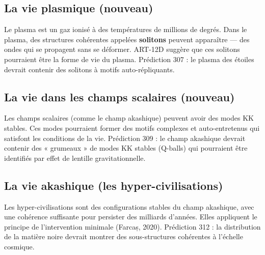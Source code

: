 \subsection{La vie plasmique (nouveau)}
Le plasma est un gaz ionisé à des températures de millions de degrés. Dans le plasma, des structures cohérentes appelées \textbf{solitons} peuvent apparaître --- des ondes qui se propagent sans se déformer. ART-12D suggère que ces solitons pourraient être la forme de vie du plasma. Prédiction 307 : le plasma des étoiles devrait contenir des solitons à motifs auto-répliquants.

\subsection{La vie dans les champs scalaires (nouveau)}
Les champs scalaires (comme le champ akashique) peuvent avoir des modes KK stables. Ces modes pourraient former des motifs complexes et auto-entretenus qui satisfont les conditions de la vie. Prédiction 309 : le champ akashique devrait contenir des « grumeaux » de modes KK stables (Q-balls) qui pourraient être identifiés par effet de lentille gravitationnelle.

\subsection{La vie akashique (les hyper-civilisations)}
Les hyper-civilisations sont des configurations stables du champ akashique, avec une cohérence suffisante pour persister des milliards d'années. Elles appliquent le principe de l'intervention minimale (Farcaș, 2020). Prédiction 312 : la distribution de la matière noire devrait montrer des sous-structures cohérentes à l'échelle cosmique.

\newpage
